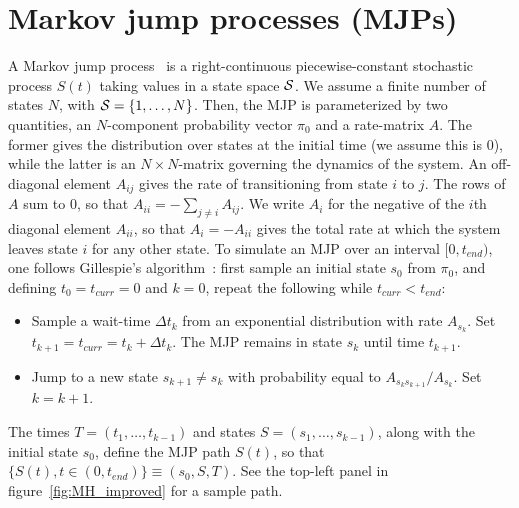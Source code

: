 \section{Markov jump processes (MJPs)} 
\label{sec:mjp}
A Markov jump process~\citep{Cinlar1975} is a right-continuous piecewise-constant stochastic process $S(t)$ taking values in a state space ${\mathcal S}$. %
We assume a finite number of states $N$, with ${\mathcal S} = \{1,\ldots,N\}$. 
Then, the MJP is parameterized by two quantities, an $N$-component probability vector $\pi_0$ and a rate-matrix $A$. 
The former gives the distribution over states at the initial time (we assume this is $0$), while the latter is an $N \times N$-matrix governing the dynamics of the system.  
An off-diagonal element $A_{ij}$ gives the rate of transitioning from state $i$ to $j$. 
The rows of $A$ sum to $0$, so that $A_{ii}=-\sum_{j \neq i} A_{ij}  $. 
We write $A_i$ for the negative of the $i$th diagonal element $A_{ii}$, so that $A_i = -A_{ii}$ gives the total rate at which the system leaves state $i$ for any other state.
To simulate an MJP over an interval $[0,t_{end})$, one follows Gillespie's algorithm~\citep{gillespie97}: 
first sample an initial state $s_0$ from $\pi_0$, and defining $t_0 = t_{curr} = 0$ and $k = 0$, repeat the following while $t_{curr} < t_{end}$:
\begin{itemize}
  \item Sample a wait-time $\Delta t_k$ from an exponential distribution with rate $A_{s_k}$.  
    Set $t_{k+1} = t_{curr} = t_{k} + \Delta t_k$. 
    The MJP remains in state $s_k$ until time $t_{k+1}$.
  \item Jump to a new state $s_{k+1} \neq s_k$ with probability equal to $A_{s_ks_{k+1}}/A_{s_k}$. Set $k=k+1$.
\end{itemize}
The times $T=(t_1, \dotsc, t_{k - 1})$ and states $S=(s_1, \dotsc, s_{k - 1 })$, along with the initial state $s_0$, define the MJP path $S(t)$, so that $\{S(t), t \in (0,t_{end})\} \equiv (s_0, S,T)$. See the top-left panel in figure~\ref{fig:MH_improved} for a sample path.

